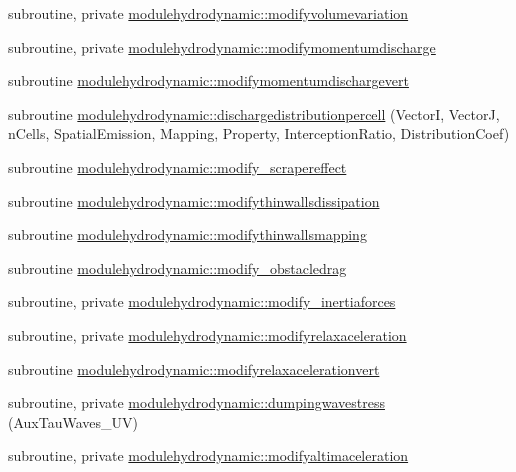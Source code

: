 \begin{DoxyCompactItemize}
\item 
subroutine, private \mbox{\hyperlink{namespacemodulehydrodynamic_a4d5f643e0f8ee69139183ed0bd4a9482}{modulehydrodynamic\+::modifyvolumevariation}}
\item 
subroutine, private \mbox{\hyperlink{namespacemodulehydrodynamic_af3229a2d204d8a2f73afcb48b571d62e}{modulehydrodynamic\+::modifymomentumdischarge}}
\item 
subroutine \mbox{\hyperlink{namespacemodulehydrodynamic_a3f760d4a01b6aa649a0bc54d3b96ff54}{modulehydrodynamic\+::modifymomentumdischargevert}}
\item 
subroutine \mbox{\hyperlink{namespacemodulehydrodynamic_af887912ae7453edc3375d52c4f6cdfc3}{modulehydrodynamic\+::dischargedistributionpercell}} (VectorI, VectorJ, n\+Cells, Spatial\+Emission, Mapping, Property, Interception\+Ratio, Distribution\+Coef)
\item 
subroutine \mbox{\hyperlink{namespacemodulehydrodynamic_a9f02295d5c7e337e76ec98febfebdc0b}{modulehydrodynamic\+::modify\+\_\+scrapereffect}}
\item 
subroutine \mbox{\hyperlink{namespacemodulehydrodynamic_ae798ddafe12ad94cd6148f8e2658f074}{modulehydrodynamic\+::modifythinwallsdissipation}}
\item 
subroutine \mbox{\hyperlink{namespacemodulehydrodynamic_a70e1f2e2a0b5b92df6a6003db5b51b60}{modulehydrodynamic\+::modifythinwallsmapping}}
\item 
subroutine \mbox{\hyperlink{namespacemodulehydrodynamic_a0305b5a5c3b3ae37a5cbe73fd9fe29c6}{modulehydrodynamic\+::modify\+\_\+obstacledrag}}
\item 
subroutine, private \mbox{\hyperlink{namespacemodulehydrodynamic_abdc575076528a23bb728d486a9919cdf}{modulehydrodynamic\+::modify\+\_\+inertiaforces}}
\item 
subroutine, private \mbox{\hyperlink{namespacemodulehydrodynamic_a2f55960a6b2fdca49570785ed31a7b97}{modulehydrodynamic\+::modifyrelaxaceleration}}
\item 
subroutine \mbox{\hyperlink{namespacemodulehydrodynamic_aabfea672c59bdb0df6fb5e5dc5a72b20}{modulehydrodynamic\+::modifyrelaxacelerationvert}}
\item 
subroutine, private \mbox{\hyperlink{namespacemodulehydrodynamic_ab02a05bbd39bd69a28f6f8f585e49eb4}{modulehydrodynamic\+::dumpingwavestress}} (Aux\+Tau\+Waves\+\_\+\+UV)
\item 
subroutine, private \mbox{\hyperlink{namespacemodulehydrodynamic_a56519157850cefc5f98f52914553161e}{modulehydrodynamic\+::modifyaltimaceleration}}

\end{DoxyCompactItemize}
